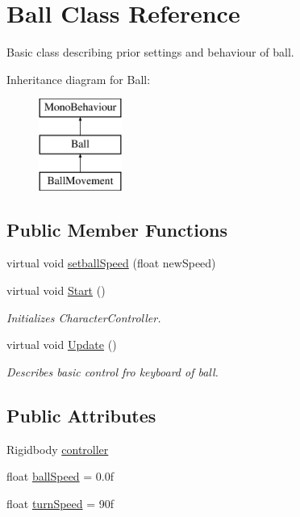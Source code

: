 \hypertarget{class_ball}{}\section{Ball Class Reference}
\label{class_ball}


Basic class describing prior settings and behaviour of ball.  


Inheritance diagram for Ball\+:\begin{figure}[H]
\begin{center}
\leavevmode
\includegraphics[height=3.000000cm]{class_ball}
\end{center}
\end{figure}
\subsection*{Public Member Functions}
\begin{DoxyCompactItemize}
\item 
virtual void \hyperlink{class_ball_a655a2ac68857807d79d7b32c3dc46b19}{setball\+Speed} (float new\+Speed)
\item 
virtual void \hyperlink{class_ball_ac82387db69cc078a600870dba29a064c}{Start} ()
\begin{DoxyCompactList}\small\item\em Initializes Character\+Controller. \end{DoxyCompactList}\item 
virtual void \hyperlink{class_ball_a237aaf0107c7bf3d7812dc8a9a642593}{Update} ()
\begin{DoxyCompactList}\small\item\em Describes basic control fro keyboard of ball. \end{DoxyCompactList}\end{DoxyCompactItemize}
\subsection*{Public Attributes}
\begin{DoxyCompactItemize}
\item 
Rigidbody \hyperlink{class_ball_ae623e52a072614fd991c767b315c56d7}{controller}
\item 
float \hyperlink{class_ball_a9f152c3ceba4ace75c2c87d73fc40cea}{ball\+Speed} = 0.\+0f
\item 
float \hyperlink{class_ball_a7adb29497e06c56dc9dd0d55ded63aa2}{turn\+Speed} = 90f
\end{DoxyCompactItemize}
